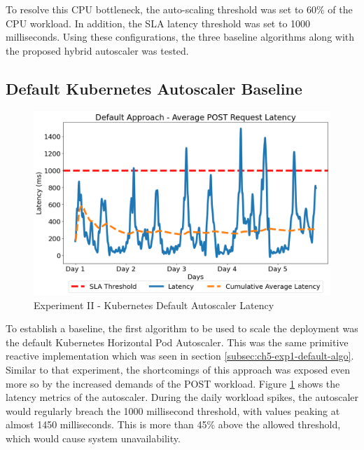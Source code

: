 To resolve this CPU bottleneck, the auto-scaling threshold was set to 60\% of the CPU workload. In addition, the SLA latency threshold was set to 1000 milliseconds. Using these configurations, the three baseline algorithms along with the proposed hybrid autoscaler was tested.\par

\subsection {Default Kubernetes Autoscaler Baseline}
\label{subsec:ch5-exp2-default-algo}

\begin{figure}[htb]
    \centering
    \caption{Experiment II - Kubernetes Default Autoscaler Latency}
    \label{fig:exp2-default-k8s}
    \includegraphics[width=0.6\linewidth]{Figures/Compose-Post-Default-Latency.png}
\end{figure}

To establish a baseline, the first algorithm to be used to scale the deployment was the default Kubernetes Horizontal Pod Autoscaler. This was the same primitive reactive implementation which was seen in section \ref{subsec:ch5-exp1-default-algo}. Similar to that experiment, the shortcomings of this approach was exposed even more so by the increased demands of the POST workload. Figure \ref{fig:exp2-default-k8s} shows the latency metrics of the autoscaler. During the daily workload spikes, the autoscaler would regularly breach the 1000 millisecond threshold, with values peaking at almost 1450 milliseconds. This is more than 45\% above the allowed threshold, which would cause system unavailability.\par

